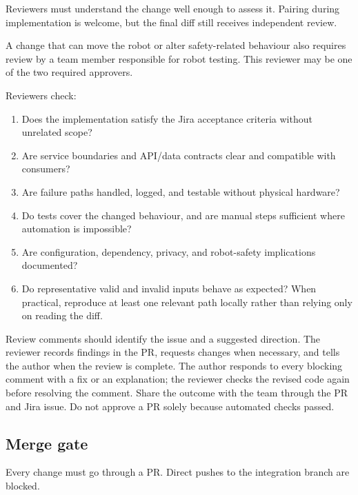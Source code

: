 \documentclass[12pt,a4paper]{article}
\begin{document}
Reviewers must understand the change well enough to assess it. Pairing during implementation is welcome, but the final diff still receives independent review.

A change that can move the robot or alter safety-related behaviour also requires review by a team member responsible for robot testing. This reviewer may be one of the two required approvers.

Reviewers check:
\begin{enumerate}

\item Does the implementation satisfy the Jira acceptance criteria without unrelated scope?

\item Are service boundaries and API/data contracts clear and compatible with consumers?

\item Are failure paths handled, logged, and testable without physical hardware?

\item Do tests cover the changed behaviour, and are manual steps sufficient where automation is impossible?

\item Are configuration, dependency, privacy, and robot-safety implications documented?

\item Do representative valid and invalid inputs behave as expected? When practical, reproduce at least one relevant path locally rather than relying only on reading the diff.

\end{enumerate}

Review comments should identify the issue and a suggested direction. The reviewer records findings in the PR, requests changes when necessary, and tells the author when the review is complete. The author responds to every blocking comment with a fix or an explanation; the reviewer checks the revised code again before resolving the comment. Share the outcome with the team through the PR and Jira issue. Do not approve a PR solely because automated checks passed.

\subsection{Merge gate}

Every change must go through a PR. Direct pushes to the integration branch are blocked.
\end{document}

